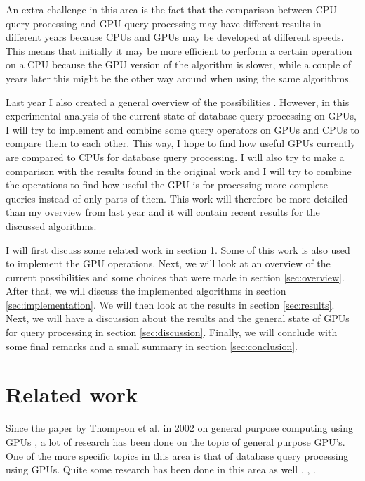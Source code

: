 \documentclass[a4paper,titlepage]{article}
\begin{document}
An extra challenge in this area is the fact that the comparison between CPU query processing and GPU query processing may have different results in different years because CPUs and GPUs may be developed at different speeds. This means that initially it may be more efficient to perform a certain operation on a CPU because the GPU version of the algorithm is slower, while a couple of years later this might be the other way around when using the same algorithms.

Last year I also created a general overview of the possibilities \cite{kostjens2015}. However, in this experimental analysis of the current state of database query processing on GPUs, I will try to implement and combine some query operators on GPUs and CPUs to compare them to each other. This way, I hope to find how useful GPUs currently are compared to CPUs for database query processing. I will also try to make a comparison with the results found in the original work and I will try to combine the operations to find how useful the GPU is for processing more complete queries instead of only parts of them. This work will therefore be more detailed than my overview from last year and it will contain recent results for the discussed algorithms.

I will first discuss some related work in section \ref{sec:related-work}. Some of this work is also used to implement the GPU operations. Next, we will look at an overview of the current possibilities and some choices that were made in section \ref{sec:overview}. After that, we will discuss the implemented algorithms in section \ref{sec:implementation}. We will then look at the results in section \ref{sec:results}. Next, we will have a discussion about the results and the general state of GPUs for query processing in section \ref{sec:discussion}. Finally, we will conclude with some final remarks and a small summary in section \ref{sec:conclusion}.

\section{Related work}
\label{sec:related-work}
Since the paper by Thompson et al. in 2002 on general purpose computing using GPUs \cite{thompson2002}, a lot of research has been done on the topic of general purpose GPU's. One of the more specific topics in this area is that of database query processing using GPUs. Quite some research has been done in this area as well \cite{bakkum2010}, \cite{fang2007}, \cite{kaldeway2010}. 
\end{document}
